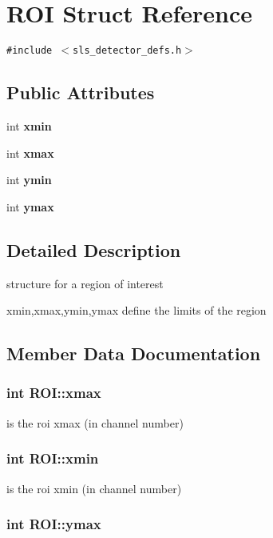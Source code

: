\section{ROI Struct Reference}
\label{structROI}
{\tt \#include $<$sls\_\-detector\_\-defs.h$>$}

\subsection*{Public Attributes}
\begin{CompactItemize}
\item 
int \bf{xmin}
\item 
int \bf{xmax}
\item 
int \bf{ymin}
\item 
int \bf{ymax}
\end{CompactItemize}


\subsection{Detailed Description}
structure for a region of interest

xmin,xmax,ymin,ymax define the limits of the region 



\subsection{Member Data Documentation}
\subsubsection{\setlength{\rightskip}{0pt plus 5cm}int \bf{ROI::xmax}}\label{structROI_e88034f1c060a9a66b6c824a0e89ace7}


is the roi xmax (in channel number) 
\subsubsection{\setlength{\rightskip}{0pt plus 5cm}int \bf{ROI::xmin}}\label{structROI_2718ba8d6b04f53f86467f4a142bc58a}


is the roi xmin (in channel number) 
\subsubsection{\setlength{\rightskip}{0pt plus 5cm}int \bf{ROI::ymax}}\label{structROI_84995369fd28f469f20f06482f6f9b68}


